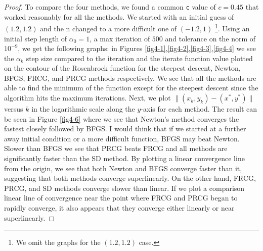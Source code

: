 \documentclass[12pt]{report}
\begin{document}
\begin{problem}
\begin{proof}
    To compare the four methods, we found a common \verb+c+ value of $c=0.45$ that worked reasonably for all the methods. We started with an initial guess of $(1.2,1.2)$ and the n changed to a more difficult one of $(-1.2,1)$ \footnote{We omit the graphs for the $(1.2,1.2)$ case.}. Using an initial step length of $\alpha_0 = 1$, a max iteration of $500$ and tolerance on the norm of $10^{-9}$, we get the following graphs: in Figures \ref{fig4-1},\ref{fig4-2},\ref{fig4-3},\ref{fig4-4} we see the $\alpha_k$ step size compared to the iteration and the iterate function value plotted on the contour of the Rosenbrock function for the steepest descent, Newton, BFGS, FRCG, and PRCG methods respectively. We see that all the methods are able to find the minimum of the function except for the steepest descent since the algorithm hits the maximum iterations. Next, we plot $\|(x_k,y_k) - (x^*,y^*)\|$ versus $k$ in the logarithmic scale along the $y$-axis for each method. The result can be seen in Figure \ref{fig4-6} where we see that Newton's method converges the fastest closely followed by BFGS. I would think that if we started at a further away initial condition or a more difficult function, BFGS may beat Newton. Slower than BFGS we see that PRCG beats FRCG and all methods are significantly faster than the SD method. By plotting a linear convergence line from the origin, we see that both Newton and BFGS converge faster than it, suggesting that both methods converge superlinearly. On the other hand, FRCG, PRCG, and SD methods converge slower than linear. If we plot a comparison linear line of convergence near the point where FRCG and PRCG began to rapidly converge, it also appears that they converge either linearly or near superlinearly.   


\end{proof}
\end{problem}
\end{document}
